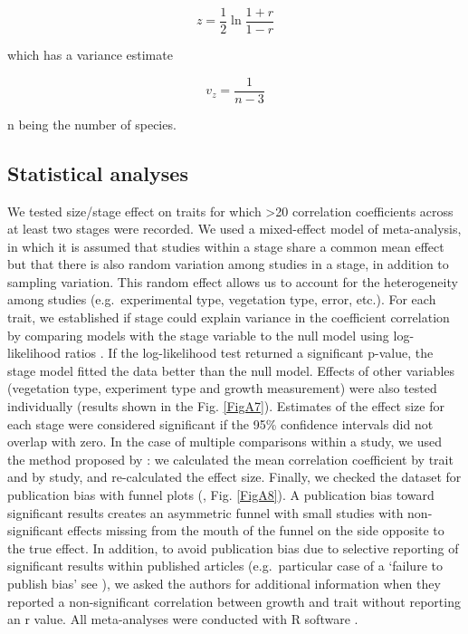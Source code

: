\documentclass[a4paper]{article}\usepackage[]{graphicx}\usepackage[]{color}
\begin{document}
\[ z = \frac{1}{2} \ln \frac{1+r}{1-r} \]

which has a variance estimate

\[ v_z= \frac{1}{n-3} \]

n being the number of species.

\subsection*{Statistical analyses}\label{statistical-analyses}

We tested size/stage effect on traits for which \textgreater{}20 correlation coefficients across at least two stages were recorded. We used a mixed-effect model of meta-analysis, in which it is assumed that studies within a stage share a common mean effect but that there is also random variation among studies in a stage, in addition to sampling variation. This random effect allows us to account for the heterogeneity among studies (e.g.~experimental type, vegetation type, error, etc.). For each trait, we established if stage could explain variance in the coefficient correlation by comparing models with the stage variable to the null model using log-likelihood ratios \citep{Zuur:2009cfa}. If the log-likelihood test returned a significant p-value, the stage model fitted the data better than the null model. Effects of other variables (vegetation type, experiment type and growth measurement) were also tested individually (results shown in the Fig. \ref{FigA7}). Estimates of the effect size for each stage were considered significant if the 95\% confidence intervals did not overlap with zero. In the case of multiple comparisons within a study, we used the method proposed by \citet{Borenstein:2009um}: we calculated the mean correlation coefficient by trait and by study, and re-calculated the effect size. Finally, we checked the dataset for publication bias with funnel plots (\citealt{Koricheva:2013tz}, Fig. \ref{FigA8}). A publication bias toward significant results creates an asymmetric funnel with small studies with non-significant effects missing from the mouth of the funnel on the side opposite to the true effect. In addition, to avoid publication bias due to selective reporting of significant results within published articles (e.g.~particular case of a `failure to publish bias' see \citealt{Jennions:2013ta}), we asked the authors for additional information when they reported a non-significant correlation between growth and trait without reporting an r value. All meta-analyses were conducted with R software \citep{Ralanguageanden:2014wf}.
\end{document}
